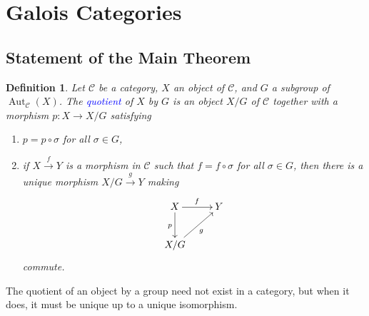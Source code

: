 \documentclass[10pt]{article}
\theoremstyle{thmstyle}
\theoremstyle{defstyle}
\newtheorem{definition}[theorem]{Definition}
\newcommand{\Aut}{\operatorname{Aut}}
\newcommand{\scrC}{\mathscr{C}} %
\newcommand{\define}[1]{\textcolor{blue}{\textit{#1}}}
\begin{document}
\section{Galois Categories}

\subsection{Statement of the Main Theorem}

\begin{definition}
    Let $\scrC$ be a category, $X$ an object of $\scrC$, and $G$ a subgroup of $\Aut_{\scrC}(X)$. The \define{quotient} of $X$ by $G$ is an object $X/G$ of $\scrC$ together with a morphism $p: X\to X/G$ satisfying
    \begin{enumerate}[label=(\roman*)]
        \item $p = p\circ\sigma$ for all $\sigma\in G$,
        \item if $X\xrightarrow{f} Y$ is a morphism in $\scrC$ such that $f = f\circ\sigma$ for all $\sigma\in G$, then there is a unique morphism $X/G\xrightarrow{g} Y$ making 
        \begin{equation*}
            \xymatrix {
                X\ar[r]^f\ar[d]_p & Y\\
                X/G\ar[ru]_g
            }
        \end{equation*}
        commute.
    \end{enumerate}
\end{definition}

The quotient of an object by a group need not exist in a category, but when it does, it must be unique up to a unique isomorphism.
\end{document}
